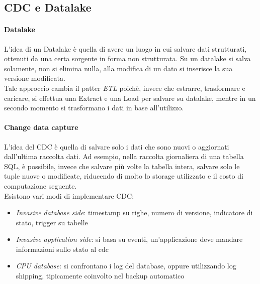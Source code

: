\subsection{CDC e Datalake}

\paragraph{Datalake}
L'idea di un Datalake è quella di avere un luogo in cui salvare dati strutturati, 
ottenuti da una certa sorgente in forma non strutturata. Su un datalake si salva 
solamente, non si elimina nulla, alla modifica di un dato si inserisce la sua versione 
modificata.\\
Tale approccio cambia il patter \emph{ETL} poichè, invece che estrarre, trasformare e caricare, 
si effettua una Extract e una 
Load per salvare su datalake, mentre in un secondo momento si trasformano i dati in base 
all'utilizzo.

\paragraph{Change data capture}
L'idea del CDC è quella di salvare solo i dati che sono nuovi o aggiornati dall'ultima
raccolta dati. Ad esempio, nella raccolta giornaliera di una tabella SQL, è possibile, 
invece che salvare più volte la tabella intera, salvare solo le tuple nuove o 
modificate, riducendo di molto lo storage utilizzato e il costo di computazione 
seguente.\\
Esistono vari modi di implementare CDC:
\begin{itemize}
    \item \emph{Invasive database side}: timestamp su righe, numero di versione, 
    indicatore di stato, trigger su tabelle
    \item \emph{Invasive application side}: si basa su eventi, un'applicazione deve mandare 
    informazioni sullo stato al cdc 
    \item \emph{CPU database}: si confrontano i log del database, oppure utilizzando log shipping, 
    tipicamente coinvolto nel backup automatico
\end{itemize}

